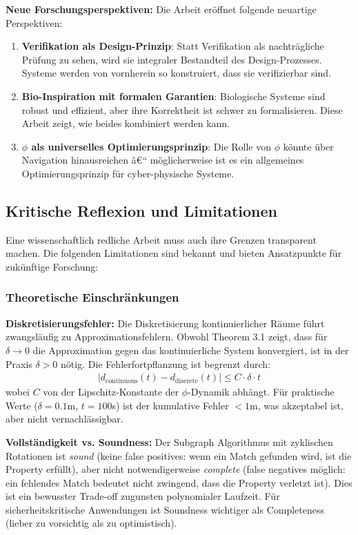 ﻿\documentclass[a4paper,12pt]{article}
\theoremstyle{definition}
\begin{document}
\textbf{Neue Forschungsperspektiven:}
Die Arbeit eröffnet folgende neuartige Perspektiven:

\begin{enumerate}
	\item \textbf{Verifikation als Design-Prinzip}: Statt Verifikation als nachträgliche Prüfung zu sehen, wird sie integraler Bestandteil des Design-Prozesses. Systeme werden von vornherein so konstruiert, dass sie verifizierbar sind.
	
	\item \textbf{Bio-Inspiration mit formalen Garantien}: Biologische Systeme sind robust und effizient, aber ihre Korrektheit ist schwer zu formalisieren. Diese Arbeit zeigt, wie beides kombiniert werden kann.
	
	\item \textbf{$\phi$ als universelles Optimierungsprinzip}: Die Rolle von $\phi$ könnte über Navigation hinausreichen â€“ möglicherweise ist es ein allgemeines Optimierungsprinzip für cyber-physische Systeme.
\end{enumerate}

\subsection{Kritische Reflexion und Limitationen}

Eine wissenschaftlich redliche Arbeit muss auch ihre Grenzen transparent machen. Die folgenden Limitationen sind bekannt und bieten Ansatzpunkte für zukünftige Forschung:

\subsubsection{Theoretische Einschränkungen}

\textbf{Diskretisierungsfehler:}
Die Diskretisierung kontinuierlicher Räume führt zwangsläufig zu Approximationsfehlern. Obwohl Theorem 3.1 zeigt, dass für $\delta \to 0$ die Approximation gegen das kontinuierliche System konvergiert, ist in der Praxis $\delta > 0$ nötig. Die Fehlerfortpflanzung ist begrenzt durch:
\begin{align}
	|d_{\text{continuous}}(t) - d_{\text{discrete}}(t)| \leq C \cdot \delta \cdot t
\end{align}
wobei $C$ von der Lipschitz-Konstante der $\phi$-Dynamik abhängt. Für praktische Werte ($\delta = 0.1$m, $t = 100$s) ist der kumulative Fehler $< 1$m, was akzeptabel ist, aber nicht vernachlässigbar.

\textbf{Vollständigkeit vs. Soundness:}
Der Subgraph Algorithmus mit zyklischen Rotationen ist \textit{sound} (keine false positives: wenn ein Match gefunden wird, ist die Property erfüllt), aber nicht notwendigerweise \textit{complete} (false negatives möglich: ein fehlendes Match bedeutet nicht zwingend, dass die Property verletzt ist). Dies ist ein bewusster Trade-off zugunsten polynomialer Laufzeit. Für sicherheitskritische Anwendungen ist Soundness wichtiger als Completeness (lieber zu vorsichtig als zu optimistisch).
\end{document}
